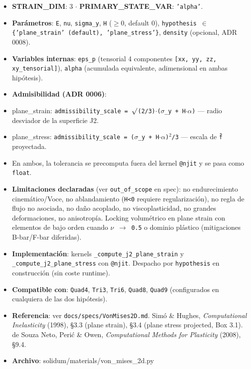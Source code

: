 \documentclass[11pt,letterpaper,oneside]{report}
\begin{document}
\begin{itemize}
  \item \textbf{STRAIN\_DIM}: 3 \ensuremath{\cdot} \textbf{PRIMARY\_STATE\_VAR}: \texttt{'alpha'}.
  \item \textbf{Parámetros}: \texttt{E}, \texttt{nu}, \texttt{sigma\_y}, \texttt{H} (\ensuremath{\ge}0, default 0), \texttt{hypothesis \ensuremath{\in} \{'plane\_strain' (default), 'plane\_stress'\}}, \texttt{density} (opcional, ADR 0008).
  \item \textbf{Variables internas}: \texttt{eps\_p} (tensorial 4 componentes \texttt{[xx, yy, zz, xy\_tensorial]}), \texttt{alpha} (acumulada equivalente, adimensional en ambas hipótesis).
  \item \textbf{Admisibilidad (ADR 0006)}:
  \item plane\_strain: \texttt{admissibility\_scale = \ensuremath{\surd}(2/3)\ensuremath{\cdot}(\ensuremath{\sigma}\_y + H\ensuremath{\cdot}\ensuremath{\alpha})} --- radio desviador de la superficie J2.
  \item plane\_stress: \texttt{admissibility\_scale = (\ensuremath{\sigma}\_y + H\ensuremath{\cdot}\ensuremath{\alpha})\ensuremath{^{2}}/3} --- escala de \texttt{f̄} proyectada.
  \item En ambos, la tolerancia se precomputa fuera del kernel \texttt{@njit} y se pasa como \texttt{float}.
  \item \textbf{Limitaciones declaradas} (ver \texttt{out\_of\_scope} en spec): no endurecimiento cinemático/Voce, no ablandamiento (\texttt{H<0} requiere regularización), no regla de flujo no asociada, no daño acoplado, no viscoplasticidad, no grandes deformaciones, no anisotropía. Locking volumétrico en plane strain con elementos de bajo orden cuando \texttt{\ensuremath{\nu} \ensuremath{\to} 0.5} o dominio plástico (mitigaciones B-bar/F-bar diferidas).
  \item \textbf{Implementación}: kernels \texttt{\_compute\_j2\_plane\_strain} y \texttt{\_compute\_j2\_plane\_stress} con \texttt{@njit}. Despacho por \texttt{hypothesis} en construcción (sin coste runtime).
  \item \textbf{Compatible con}: \texttt{Quad4}, \texttt{Tri3}, \texttt{Tri6}, \texttt{Quad8}, \texttt{Quad9} (configurados en cualquiera de las dos hipótesis).
  \item \textbf{Referencia}: ver \texttt{docs/specs/VonMises2D.md}. Simó \& Hughes, \textit{Computational Inelasticity} (1998), §3.3 (plane strain), §3.4 (plane stress projected, Box 3.1). de Souza Neto, Perić \& Owen, \textit{Computational Methods for Plasticity} (2008), §9.4.
  \item \textbf{Archivo}: solidum/materials/von\_mises\_2d.py
\end{itemize}
\end{document}
